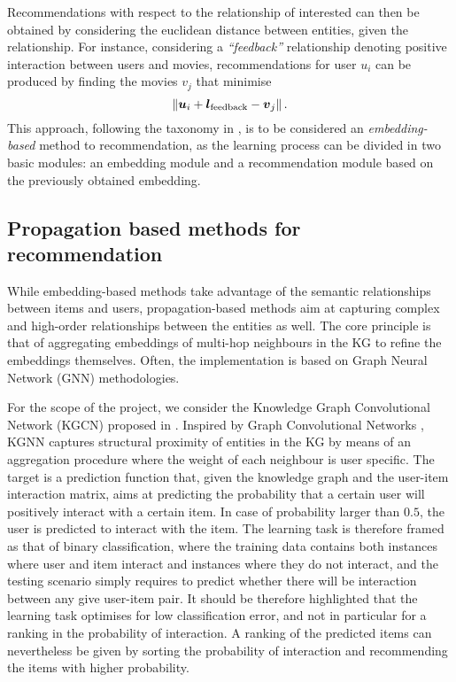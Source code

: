 Recommendations  with respect to the relationship of interested can then be obtained by considering the euclidean distance between entities, given the relationship.
For instance, considering a \emph{``feedback''} relationship denoting positive interaction between users and movies, recommendations for user $u_i$ can be produced by finding the movies $v_j$ that minimise 
\begin{equation}\label{eq:transe_interaction}
  \left\lVert\boldsymbol{u}_i + \boldsymbol{l}_{\text{feedback}} - \boldsymbol{v}_j\right\rVert.
\end{equation}
This approach, following the taxonomy in \cite{guo2020survey}, is to be considered an \emph{embedding-based} method to recommendation, as the learning process can be divided in two basic modules: an embedding module and a recommendation module based on the previously obtained embedding.


\subsection{Propagation based methods for recommendation}\label{sec:kgcn}

While embedding-based methods take advantage of the semantic relationships between items and users, propagation-based methods aim at capturing complex and high-order relationships between the entities as well.
The core principle is that of aggregating embeddings of multi-hop neighbours in the KG to refine the embeddings themselves.
Often, the implementation is based on Graph Neural Network (GNN) methodologies.

For the scope of the project, we consider the Knowledge Graph Convolutional Network (KGCN) proposed in \cite{wang2019knowledge}.
Inspired by Graph Convolutional Networks \parencite{zhang2019graph}, KGNN captures structural proximity of entities in the KG by means of an aggregation procedure where the weight of each neighbour is user specific.
The target is a prediction function that, given the knowledge graph and the user-item interaction matrix, aims at predicting the probability that a certain user will positively interact with a certain item.
In case of probability larger than $0.5$, the user is predicted to interact with the item.
The learning task is therefore framed as that of binary classification, where the training data contains both instances where user and item interact and instances where they do not interact, and the testing scenario simply requires to predict whether there will be interaction between any give user-item pair.
It should be therefore highlighted that the learning task optimises for low classification error, and not in particular for a ranking in the probability of interaction.
A ranking of the predicted items can nevertheless be given by sorting the probability of interaction and recommending the items with higher probability.


